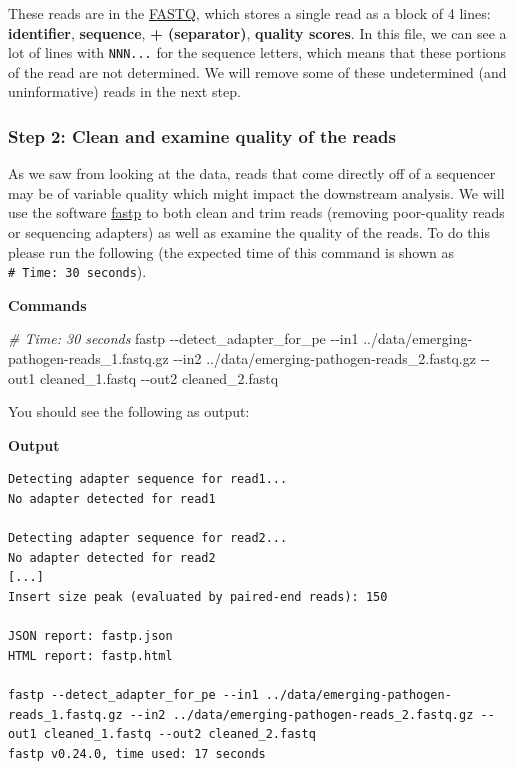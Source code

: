\documentclass[
]{book}
\newenvironment{Shaded}{\begin{snugshade}}{\end{snugshade}}
\newcommand{\AttributeTok}[1]{\textcolor[rgb]{0.13,0.29,0.53}{#1}}
\newcommand{\CommentTok}[1]{\textcolor[rgb]{0.56,0.35,0.01}{\textit{#1}}}
\newcommand{\ExtensionTok}[1]{#1}
\newcommand{\NormalTok}[1]{#1}
\begin{document}
These reads are in the \href{https://en.wikipedia.org/wiki/FASTQ_format}{FASTQ}, which stores a single read as a block of 4 lines: \textbf{identifier}, \textbf{sequence}, \textbf{+ (separator)}, \textbf{quality scores}. In this file, we can see a lot of lines with \texttt{NNN...} for the sequence letters, which means that these portions of the read are not determined. We will remove some of these undetermined (and uninformative) reads in the next step.

\subsubsection{Step 2: Clean and examine quality of the reads}\label{exercise-quality-reads}

As we saw from looking at the data, reads that come directly off of a sequencer may be of variable quality which might impact the downstream analysis. We will use the software \href{https://github.com/OpenGene/fastp}{fastp} to both clean and trim reads (removing poor-quality reads or sequencing adapters) as well as examine the quality of the reads. To do this please run the following (the expected time of this command is shown as \texttt{\#\ Time:\ 30\ seconds}).

\textbf{Commands}

\begin{Shaded}
\begin{Highlighting}[]
\CommentTok{\# Time: 30 seconds}
\ExtensionTok{fastp} \AttributeTok{{-}{-}detect\_adapter\_for\_pe} \AttributeTok{{-}{-}in1}\NormalTok{ ../data/emerging{-}pathogen{-}reads\_1.fastq.gz }\AttributeTok{{-}{-}in2}\NormalTok{ ../data/emerging{-}pathogen{-}reads\_2.fastq.gz }\AttributeTok{{-}{-}out1}\NormalTok{ cleaned\_1.fastq }\AttributeTok{{-}{-}out2}\NormalTok{ cleaned\_2.fastq}
\end{Highlighting}
\end{Shaded}

You should see the following as output:

\textbf{Output}

\begin{verbatim}
Detecting adapter sequence for read1...
No adapter detected for read1

Detecting adapter sequence for read2...
No adapter detected for read2
[...]
Insert size peak (evaluated by paired-end reads): 150

JSON report: fastp.json
HTML report: fastp.html

fastp --detect_adapter_for_pe --in1 ../data/emerging-pathogen-reads_1.fastq.gz --in2 ../data/emerging-pathogen-reads_2.fastq.gz --out1 cleaned_1.fastq --out2 cleaned_2.fastq
fastp v0.24.0, time used: 17 seconds
\end{verbatim}
\end{document}
